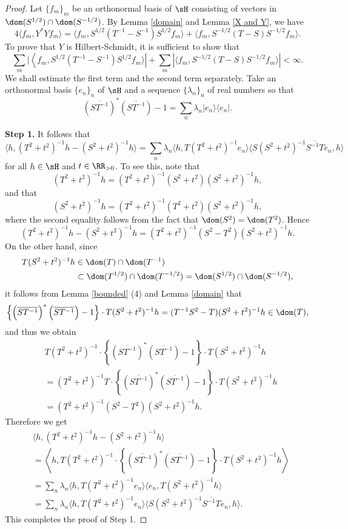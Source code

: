 \documentclass[12pt,draft]{article}
\theoremstyle{plain}
\numberwithin{equation}{section}
\theoremstyle{remark}
\begin{document}
\begin{proof}
Let $\{f_m\}_m$ be an orthonormal basis of $\sH$ consisting of vectors in $\dom(S^{1/2})\cap\dom(S^{-1/2})$.
By Lemma \ref{domain} and Lemma \ref{X and Y}, we have
\[
4\langle f_m,Y^*Yf_m\rangle = \langle f_m,S^{1/2}(T^{-1}-S^{-1})S^{1/2}f_m\rangle + \langle f_m,S^{-1/2}(T-S)S^{-1/2}f_m\rangle.
\]
To prove that $Y$ is Hilbert-Schmidt, it is sufficient to show that
\[
\sum_m|\left\langle f_m,S^{1/2}(T^{-1}-S^{-1})S^{1/2}f_m\rangle\right| + \sum_m\left|\langle f_m,S^{-1/2}(T-S)S^{-1/2}f_m\rangle\right|<\infty.
\]
We shall estimate the first term and the second term separately.
Take an orthonormal basis $\{e_n\}_n$ of $\sH$ and a sequence $\{\lambda_n\}_n$ of real numbers so that
\[
 \left(\overline{ST^{-1}}\right)^*\left(\overline{ST^{-1}}\right)-1 = \sum_n\lambda_n|e_n\rangle\langle e_n|.
\]

\textbf{Step 1.} It follows that
\[
 \langle h,(T^2+t^2)^{-1}h-(S^2+t^2)^{-1}h\rangle = \sum_n\lambda_n\langle h,T(T^2+t^2)^{-1}e_n\rangle\langle S(S^2+t^2)^{-1}\overline{S^{-1}T}e_n,h\rangle
\]
for all $h\in\sH$ and $t\in\RR_{>0}$. To see this, note that
\[
 (T^2+t^2)^{-1}h = (T^2+t^2)^{-1}(S^2+t^2)(S^2+t^2)^{-1}h,
\]
and that
\[
(S^2+t^2)^{-1}h = (T^2+t^2)^{-1}(T^2+t^2)(S^2+t^2)^{-1}h,
\]
where the second equality follows from the fact that $\dom(S^2)=\dom(T^2)$.
Hence
\[
 (T^2+t^2)^{-1}h - (S^2+t^2)^{-1}h = (T^2+t^2)^{-1}(S^2-T^2)(S^2+t^2)^{-1}h.
\]
On the other hand, since
\begin{align*}
 T(S^2+t^2)^{-1}h & \in \dom(T)\cap\dom(T^{-1})\\
 & \subset\dom(T^{1/2})\cap\dom(T^{-1/2})
 = \dom(S^{1/2})\cap\dom(S^{-1/2}),
\end{align*}
it follows from Lemma \ref{bounded} (4) and Lemma \ref{domain} that
\[
\left\{\left(\overline{ST^{-1}}\right)^*\left(\overline{ST^{-1}}\right)-1\right\}\cdot T(S^2+t^2)^{-1}h
=(T^{-1}S^2-T)(S^2+t^2)^{-1}h\in\dom(T),
\]
and thus we obtain
\begin{align*}
&T(T^2+t^2)^{-1}\cdot \left\{\left(\overline{ST^{-1}}\right)^*\left(\overline{ST^{-1}}\right)-1\right\}\cdot T(S^2+t^2)^{-1}h\\
&= (T^2+t^2)^{-1}T\cdot \left\{\left(\overline{ST^{-1}}\right)^*\left(\overline{ST^{-1}}\right)-1\right\}\cdot T(S^2+t^2)^{-1}h\\
&= (T^2+t^2)^{-1}(S^2-T^2)(S^2+t^2)^{-1}h.
\end{align*}
Therefore we get
\begin{align*}
&\langle h,(T^2+t^2)^{-1}h - (S^2+t^2)^{-1}h\rangle\\
&= \left\langle h,T(T^2+t^2)^{-1}\cdot \left\{\left(\overline{ST^{-1}}\right)^*
\left(\overline{ST^{-1}}\right)-1\right\}\cdot T(S^2+t^2)^{-1}h\right\rangle\\
&= \sum_n\lambda_n\langle h,T(T^2+t^2)^{-1}e_n\rangle\langle e_n,T(S^2+t^2)^{-1}h\rangle\\
&= \sum_n\lambda_n\langle h,T(T^2+t^2)^{-1}e_n\rangle\langle S(S^2+t^2)^{-1}\overline{S^{-1}T}e_n,h\rangle.
\end{align*}
This completes the proof of Step 1.


\end{proof}
\end{document}
